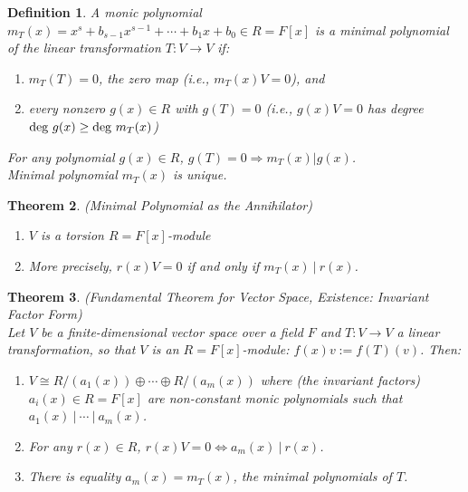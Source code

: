 \documentclass[a4paper,8pt]{article}
\newcommand{\hlt}[1]{\textit{{\color{blue}#1}}}
\newcommand{\degs}[1]{\textnormal{deg}#1}
\theoremstyle{theorem}
\newtheorem{theorem}{Theorem}[subsection]
\newtheorem{definition}[theorem]{Definition}
\begin{document}
\begin{definition}
A monic polynomial $m_T(x) = x^s + b_{s-1} x^{s-1} + \cdots + b_1 x + b_0 \in R = F[x]$ is a \hlt{minimal polynomial} of the linear transformation $T: V \rightarrow V$ if:
\begin{enumerate}[label=(\roman*)]
\item $m_T(T) = 0$, the zero map (i.e., $m_T(x)V = 0$), and
\item every nonzero $g(x) \in R$ with $g(T) = 0$ (i.e., $g(x)V = 0$ has degree $\degs \ g(x) \geq \degs \ m_T(x)$)
\end{enumerate}
For any polynomial $g(x) \in R$, $g(T) = 0 \Rightarrow m_T(x) | g(x)$.\\
Minimal polynomial $m_T(x)$ is unique.
\end{definition}

\begin{theorem}
\hlt{(Minimal Polynomial as the Annihilator)}
\begin{enumerate}[label=(\roman*)]
\item $V$ is a torsion $R = F[x]$-module
\item More precisely, $r(x)V = 0$ if and only if $m_T(x) \ | \ r(x)$.
\end{enumerate}
\end{theorem}

\begin{theorem}
\label{thm:fundthmfvpeiff}
\hlt{(Fundamental Theorem for Vector Space, Existence: Invariant Factor Form)}\\
Let $V$ be a finite-dimensional vector space over a field $F$ and $T: V \rightarrow V$ a linear transformation, so that $V$ is an $R = F[x]$-module: $f(x)v := f(T)(v)$. Then:
\begin{enumerate}[label=(\roman*)]
\item $V \cong R/(a_1(x)) \oplus \cdots \oplus R/(a_m(x))$ where (the invariant factors) $a_i(x) \in R = F[x]$ are non-constant monic polynomials such that $a_1(x) \ | \ \cdots \ | \ a_m(x)$.
\item For any $r(x) \in R$, $r(x)V=0 \Leftrightarrow a_m(x) \ | \ r(x)$.
\item There is equality $a_m(x) = m_T(x)$, the minimal polynomials of $T$.
\end{enumerate}
\end{theorem}
\end{document}
